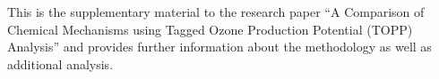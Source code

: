 This is the supplementary material to the research paper ``A Comparison of Chemical Mechanisms using Tagged Ozone Production Potential (TOPP) Analysis'' and provides further information about the methodology as well as additional analysis.  
